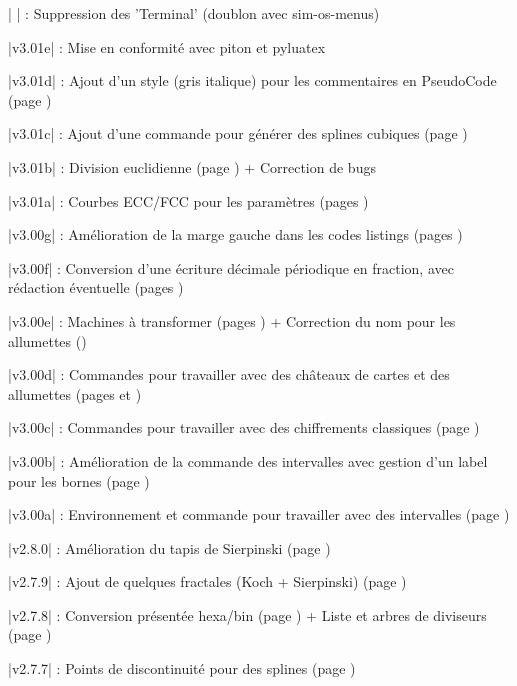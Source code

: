 {\small \bverb|      | : Suppression des 'Terminal' (doublon avec \textsf{sim-os-menus})

{\small \bverb|v3.01e| : Mise en conformité avec \textsf{piton} et \textsf{pyluatex}

{\small \bverb|v3.01d| : Ajout d'un style (gris italique) pour les commentaires en PseudoCode (page \pageref{pseudocode})

{\small \bverb|v3.01c| : Ajout d'une commande pour générer des splines cubiques (page \pageref{gensplines})

{\small \bverb|v3.01b| : Division euclidienne (page \pageref{diveucl})} + Correction de bugs

{\small \bverb|v3.01a| : Courbes ECC/FCC pour les paramètres (pages \pageref{eccfcc})}

{\small \bverb|v3.00g| : Amélioration de la marge gauche dans les codes \textsf{listings} (pages \pageref{pseudocode})}

{\small \bverb|v3.00f| : Conversion d'une écriture décimale périodique en fraction, avec rédaction éventuelle (pages \pageref{fracperiod})}

{\small \bverb|v3.00e| : Machines à transformer (pages \pageref{machtransf}) + Correction du nom pour les allumettes (\pageref{allumettes})}

{\small \bverb|v3.00d| : Commandes pour travailler avec des châteaux de cartes et des allumettes (pages \pageref{chateaux} et \pageref{allumettes})}

{\small \bverb|v3.00c| : Commandes pour travailler avec des chiffrements classiques (page \pageref{chiffrements})}

{\small \bverb|v3.00b| : Amélioration de la commande des intervalles avec gestion d'un label pour les bornes (page \pageref{intervalles})}

{\small \bverb|v3.00a| : Environnement et commande pour travailler avec des intervalles (page \pageref{intervalles})}

\hrulefill

{\small \bverb|v2.8.0| : Amélioration du tapis de Sierpinski (page \pageref{fractales})}

{\small \bverb|v2.7.9| : Ajout de quelques fractales (Koch + Sierpinski) (page \pageref{fractales})}

{\small \bverb|v2.7.8| : Conversion présentée hexa/bin (page \pageref{convhexbin}) + Liste et arbres de diviseurs (page \pageref{listediv})}

{\small \bverb|v2.7.7| : Points de discontinuité pour des splines (page \pageref{discont})}

}}}}
